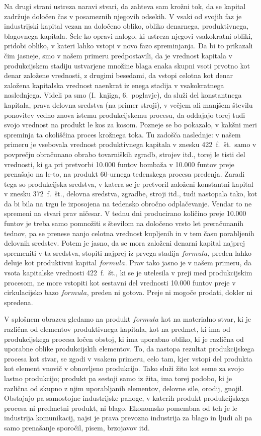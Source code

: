 \documentclass[kapital_02.tex]{subfiles}
\begin{document}
Na drugi strani ustreza naravi stvari, da zahteva sam krožni tok, da se kapital zadržuje določen čas v posameznih njegovih odsekih. V vsaki od svojih faz je industrijski kapital vezan na določeno obliko, obliko denarnega, produktivnega, blagovnega kapitala. Šele ko opravi nalogo, ki ustreza njegovi vsakokratni obliki, pridobi obliko, v kateri lahko vstopi v novo fazo spreminjanja. Da bi to prikazali čim jasneje, smo v našem primeru predpostavili, da je vrednost kapitala v produkcijskem stadiju ustvarjene množine blaga enaka skupni vsoti prvotno kot denar založene vrednosti, z drugimi besedami, da vstopi celotna kot denar založena kapitalska vrednost naenkrat iz enega stadija v vsakokratnega naslednjega. Videli pa smo (I.~knjiga, 6.~poglavje), da služi del konstantnega kapitala, prava delovna sredstva (na primer stroji), v večjem ali manjšem številu ponovitev vedno znova istemu produkcijskemu procesu, da oddajajo torej tudi svojo vrednost na produkt le kos za kosom. Pozneje se bo pokazalo, v kakšni meri spreminja ta okoliščina proces krožnega toka. Tu zadošča naslednje: v našem primeru je vsebovala vrednost produktivnega kapitala v znesku 422~f.~št.\ samo v povprečju obračunano obrabo tovarniških zgradb, strojev itd., torej le tisti del vrednosti, ki ga pri pretvorbi 10.000 funtov bombaža v 10.000 funtov preje prenašajo na le-to, na produkt 60-urnega tedenskega procesa predenja. Zaradi tega so produkcijska sredstva, v katera se je pretvoril založeni konstantni kapital v znesku 372~f.~št., delovna sredstva, zgradbe, stroji itd., tudi nastopala tako, kot da bi bila na trgu le izposojena na tedensko obročno odplačevanje. Vendar to ne spremeni na stvari prav ničesar. V tednu dni producirano količino preje 10.000 funtov je treba samo pomnožiti s številom na določeno vrsto let preračunanih tednov, pa se prenese nanjo celotna vrednost kupljenih in v tem času porabljenih delovnih sredstev. Potem je jasno, da se mora založeni denarni kapital najprej spremeniti v ta sredstva, stopiti najprej iz prvega stadija \( formula \), preden lahko deluje kot produktivni kapital \( formula \). Prav tako jasno je v našem primeru, da vsota kapitalske vrednosti 422~f.~št., ki se je utelesila v preji med produkcijskim procesom, ne more vstopiti kot sestavni del vrednosti 10.000 funtov preje v cirkulacijsko bazo \( formula \), preden ni gotova. Preje ni mogoče prodati, dokler ni spredena.

V splošnem obrazcu gledamo na produkt \( formula \) kot na materialno stvar, ki je različna od elementov produktivnega kapitala, kot na predmet, ki ima od produkcijskega procesa ločen obstoj, ki ima uporabno obliko, ki je različna od uporabne oblike produkcijskih elementov. To, da nastopa rezultat produkcijskega procesa kot stvar, se zgodi v vsakem primeru, celo tam, kjer vstopi del produkta kot element vnovič v obnovljeno produkcijo. Tako služi žito kot seme za svojo lastno produkcijo; produkt pa sestoji samo iz žita, ima torej podobo, ki je različna od skupno z njim uporabljanih elementov, delovne sile, orodij, gnojil. Obstajajo pa samostojne industrijske panoge, v katerih produkt produkcijskega procesa ni predmetni produkt, ni blago. Ekonomsko pomembna od teh je le industrija komunikacij, najsi je prava prevozna industrija za blago in ljudi ali pa samo prenašanje sporočil, pisem, brzojavov itd.
\end{document}
